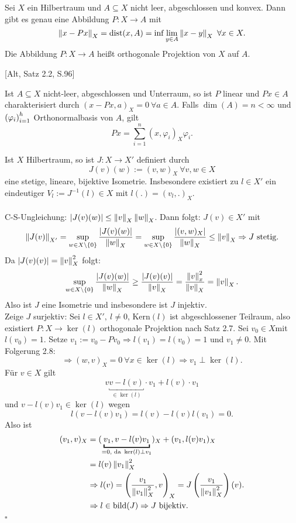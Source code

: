 Sei $X$ ein Hilbertraum und $A\subseteq X$ nicht leer, abgeschlossen und konvex.
Dann gibt es genau eine Abbildung $P:X\to A$ mit
\[
\left\Vert x-Px\right\Vert_X = \operatorname{dist}(x,A) = \inf\lim\limits_{y\in A} \left\Vert x-y\right\Vert_X ~\forall x\in X.
\]
Die Abbildung $P:X\to A$ heißt orthogonale Projektion von $X$ auf $A$.

 [Alt, Satz 2.2, S.96]

Ist $A\subseteq X$ nicht-leer, abgeschlossen und Unterraum, so ist $P$ linear und $Px\in A$ charakterisiert durch $(x-Px,a)_X = 0~\forall a\in A$.
Falls $\dim(A) = n<\infty$ und $\left( \varphi_i\right)_{i=1}^h$ Orthonormalbasis von $A$, gilt
\[
Px = \sum_{i=1}^{n} (x, \varphi_i)_X\varphi_i.
\]

Ist $X$ Hilbertraum, so ist $J:X\to X'$ definiert durch
\[
J(v)(w) := (v,w)_X ~\forall v,w\in X 
\]
eine stetige, lineare, bijektive Isometrie.
Insbesondere existiert zu $l\in X'$ ein eindeutiger  $V_l := J^{-1}(l)\in X$ mit $l(.) = (v_l,.)_X$.\\

\\
C-S-Ungleichung: $\left\vert J(v)(w)\right\vert\le \left\Vert v\right\Vert_X\left\Vert w\right\Vert_X$.
Dann folgt: $ J(v)\in X'$ mit 
\[
\left\Vert J(v)\right\Vert_{X'} = \sup\limits_{w\in X\backslash\{0\}} \frac{\left\vert J(v)(w)\right\vert}{\left\Vert w\right\Vert_X} = \sup\limits_{w\in X\backslash\{0\}} \frac{\left\vert(v,w)_X\right\vert}{\left\Vert w\right\Vert_X} \le \left\Vert v\right\Vert_X \Rightarrow J \text{ stetig}.
\]
Da $\left\vert J(v)(v)\right\vert = \left\Vert v\right\Vert_X^2$ folgt:
\[
\sup\limits_{w\in X\backslash\{0\}} \frac{\left\vert J(v)(w)\right\vert}{\left\Vert w\right\Vert_X} \ge \frac{\left\vert J(v)(v)\right\vert}{\left\Vert v\right\Vert_X} = \frac{\left\Vert v\right\Vert_x^2}{\left\Vert v\right\Vert_X} = \left\Vert v\right\Vert_X.
\]
Also ist $J$ eine Isometrie und insbesondere ist $J$ injektiv.\\
Zeige $J$ surjektiv: Sei $l\in X',~l\neq 0$, Kern$(l)$ ist abgeschlossener Teilraum, also existiert $P:X\to \ker(l)$ orthogonale Projektion nach Satz 2.7.
Sei $v_0\in X$mit $l(v_0)=1$. 
Setze $v_1:=v_0-Pv_0\Rightarrow l(v_1) =l(v_0) =1$ und $v_1\neq 0$.
Mit Folgerung 2.8:
\[
\Rightarrow (w,v)_X =0~ \forall x\in\ker(l) \Rightarrow v_1 \perp \ker(l). 
\]
Für $v\in X$ gilt
\[
v\underbracket{v-l(v)}_{\in \ker(l)}\cdot v_1 + l(v)\cdot v_1
\]
und $v-l(v)v_1\in \ker(l)$ wegen
\[
l(v-l(v)v_1) = l(v) -l(v)l(v_1) =0.
\]
Also ist
\begin{align*}
(v_1,v)_X &= (\underbracket{v_1,v-l(v)v_1}_{=0,\text{ da }\ker(l) \perp v_1})_X + (v_1,l(v)v_1)_X\\
&= l(v) \norm{v_1}_X^2\\
&\Rightarrow l(v) = \enbrace{\frac{v_1}{\norm{v_1}_X^2},v}_X = J\enbrace{\frac{v_1}{\norm{v_1}_X^2}}(v).\\
&\Rightarrow l\in \bild(J) \Rightarrow J\text{ bijektiv.}\\
\end{align*}
\hfill $\square$

